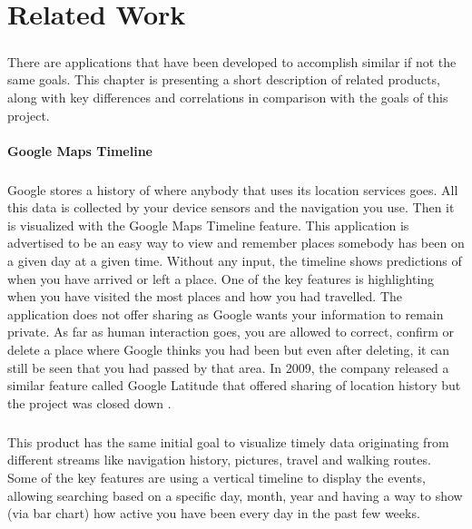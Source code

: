 \documentclass{l4proj}
\begin{document}
\chapter{Related Work}
\paragraph{}
There are applications that have been developed to accomplish similar if not the same goals. This chapter is presenting a short description of related products, along with key differences and correlations in comparison with the goals of this project.  

\subsubsection{Google Maps Timeline} 
\paragraph{}
Google stores a history of where anybody that uses its location services goes. All this data is collected by your device sensors and the navigation you use. Then it is visualized with the Google Maps Timeline \cite{GoogleMapsTimeline} feature. This application is advertised to be an easy way to view and remember places somebody has been on a given day at a given time. Without any input, the timeline shows predictions of when you have arrived or left a place. One of the key features is highlighting when you have visited the most places and how you had travelled. The application does not offer sharing as Google wants your information to remain private. As far as human interaction goes, you are allowed to correct, confirm or delete a place where Google thinks you had been but even after deleting,  it can still be seen that you had passed by that area. In 2009, the company released a similar feature called Google Latitude that offered sharing of location history but the project was closed down \cite{GMTimeFeature}.

\paragraph{}
This product has the same initial goal to visualize timely data originating from different streams like navigation history, pictures, travel and walking routes. Some of the key features are using a vertical timeline to display the events, allowing searching based on a specific day, month, year and having a way to show (via bar chart) how active you have been every day in the past few weeks. 
\end{document}

